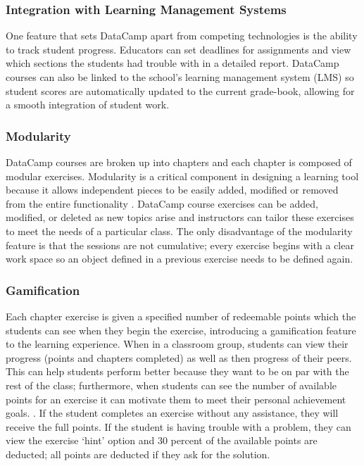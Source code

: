 \documentclass[12pt]{article}\usepackage[]{graphicx}\usepackage[]{color}
\begin{document}
\subsubsection{Integration with Learning Management Systems}
One feature that sets DataCamp apart from competing technologies is the ability to track student progress. Educators
can set deadlines for assignments and view which sections the
students had trouble with in a detailed report. DataCamp courses can also be linked to the school's learning management system (LMS) so student scores are automatically updated to the
current grade-book, allowing for a smooth integration of student work.

\subsubsection{Modularity}
DataCamp courses are broken up into chapters and each chapter is composed of modular exercises. Modularity is a critical component in designing a
learning tool because it allows independent pieces to be easily added, modified or removed from the entire functionality
\citep{Hare2017}. DataCamp course exercises can be added, modified, or deleted as new topics arise and instructors can tailor
these exercises to meet the needs of a particular class. The only disadvantage of the modularity feature is that the sessions
are not cumulative; every exercise begins with a clear work space so an object defined in a previous exercise needs to be
defined again.

\subsubsection{Gamification}
Each chapter exercise is given a specified number of redeemable points which the students can see when they begin
the exercise, introducing a gamification feature to the learning experience. When in a classroom group, students can view their
progress (points and chapters completed) as well as then progress of their peers. This can help students perform better
because they want to be on par with the rest of the class; furthermore, when students can see the number of available points
for an exercise it can motivate them to meet their personal achievement goals. \citep{Chang2016}. If the student completes an exercise without
any assistance, they will receive the full points. If the student is having trouble with a problem, they can view the exercise `hint' option and 30 percent
of the available points are deducted; all points are deducted if they ask for the solution. 
\end{document}
